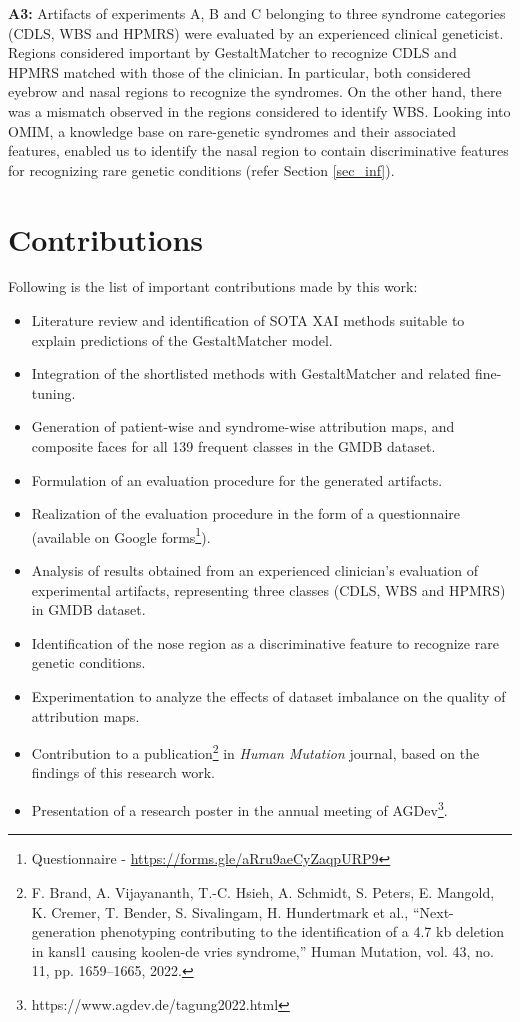 \documentclass[../report.tex]{subfiles}
\begin{document}
	\textbf{A3:} Artifacts of experiments A, B and C belonging to three syndrome categories (CDLS, WBS and HPMRS) were evaluated by an experienced clinical geneticist. Regions considered important by GestaltMatcher to recognize CDLS and HPMRS matched with those of the clinician. In particular, both considered eyebrow and nasal regions to recognize the syndromes. On the other hand, there was a mismatch observed in the regions considered to identify WBS. Looking into OMIM, a knowledge base on rare-genetic syndromes and their associated features, enabled us to identify the nasal region to contain discriminative features for recognizing rare genetic conditions (refer Section \ref{sec_inf}).
	
    \section{Contributions}
	Following is the list of important contributions made by this work:
	\begin{itemize}
	\item Literature review and identification of SOTA XAI methods suitable to explain predictions of the GestaltMatcher model.
	\item Integration of the shortlisted methods with GestaltMatcher and related fine-tuning.
	\item Generation of patient-wise and syndrome-wise attribution maps, and composite faces for all 139 frequent classes in the GMDB dataset.
	\item Formulation of an evaluation procedure for the generated artifacts.
	\item Realization of the evaluation procedure in the form of a questionnaire (available on Google forms\footnote[1]{Questionnaire - \url{https://forms.gle/aRru9aeCyZaqpURP9}}).
	\item Analysis of results obtained from an experienced clinician's evaluation of experimental artifacts, representing three classes (CDLS, WBS and HPMRS) in GMDB dataset.
	\item Identification of the nose region as a discriminative feature to recognize rare genetic conditions.
	\item Experimentation to analyze the effects of dataset imbalance on the quality of attribution maps.
	\item Contribution to a publication\footnote[2]{F. Brand, A. Vijayananth, T.-C. Hsieh, A. Schmidt, S. Peters, E. Mangold, K. Cremer, T. Bender,
		S. Sivalingam, H. Hundertmark et al., “Next-generation phenotyping contributing to the identification
		of a 4.7 kb deletion in kansl1 causing koolen-de vries syndrome,” Human Mutation, vol. 43, no. 11,
		pp. 1659–1665, 2022.} in \textit{Human Mutation }journal, based on the findings of this research work.
	\item Presentation of a research poster in the annual meeting of AGDev\footnote[3]{https://www.agdev.de/tagung2022.html}.
	\end{itemize}
\end{document}
